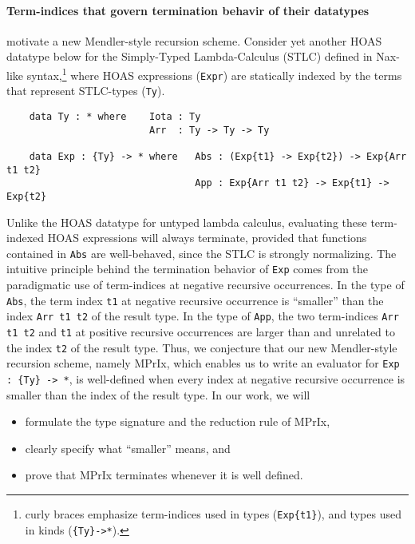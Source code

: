 \documentclass[a4paper]{easychair} %
\begin{document}
\paragraph{Term-indices that govern termination behavir of their datatypes\!\!}
motivate a new Mendler-style recursion scheme.
Consider yet another HOAS datatype below for the Simply-Typed Lambda-Calculus (STLC)
defined in Nax-like syntax,\footnote{curly braces emphasize
  term-indices used in types (\texttt{Exp\{t1\}}),
  and types used in kinds (\texttt{\{Ty\}\;->\;*}).}
where HOAS expressions (\texttt{Expr}) are
statically indexed by the terms that represent STLC-types (\texttt{Ty}).
\begin{verbatim}
    data Ty : * where    Iota : Ty
                         Arr  : Ty -> Ty -> Ty

    data Exp : {Ty} -> * where   Abs : (Exp{t1} -> Exp{t2}) -> Exp{Arr t1 t2}
                                 App : Exp{Arr t1 t2} -> Exp{t1} -> Exp{t2}
\end{verbatim}
Unlike the HOAS datatype for untyped lambda calculus, evaluating
these term-indexed HOAS expressions will always terminate,
provided that functions contained in \texttt{Abs} are well-behaved,
since the STLC is strongly normalizing.
The intuitive principle behind the termination behavior of \texttt{Exp}
comes from the paradigmatic use of term-indices at negative recursive occurrences.  
In the type of \texttt{Abs}, the term index \texttt{t1}
at negative recursive occurrence is ``smaller'' than the index
\texttt{Arr t1 t2} of the result type. In the type of \texttt{App},
the two term-indices \texttt{Arr t1 t2} and \texttt{t1} at positive recursive
occurrences are larger than and unrelated to the index \texttt{t2} of the result type.
Thus, we conjecture that our new Mendler-style recursion scheme, namely \textsf{MPrIx},
which enables us to write an evaluator for  \verb|Exp : {Ty} -> *|, 
is well-defined when every index at negative recursive occurrence is
smaller than the index of the result type.
In our work, we will \vspace*{-1ex}
\begin{itemize}
 \item formulate the type signature and the reduction rule of \textsf{MPrIx},
 \vspace*{-1ex}
 \item clearly specify what ``smaller'' means, and
 \vspace*{-1ex}
 \item prove that \textsf{MPrIx} terminates whenever it is well defined.
\end{itemize}
\end{document}
